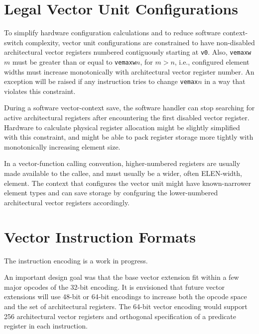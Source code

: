 \section{Legal Vector Unit Configurations}

To simplify hardware configuration calculations and to reduce software
context-switch complexity, vector unit configurations are constrained
to have non-disabled architectural vector registers numbered
contiguously starting at {\tt v0}.  Also, {\tt vemaxw}$m$ must be
greater than or equal to {\tt vemaxw}$n$, for $m > n$, i.e.,
configured element widths must increase monotonically with
architectural vector register number.  An exception will be raised if
any instruction tries to change {\tt vemax}$n$ in a way that violates
this constraint.

\begin{commentary}
  During a software vector-context save, the software handler can stop
  searching for active architectural registers after encountering the
  first disabled vector register.  Hardware to calculate physical
  register allocation might be slightly simplified with this
  constraint, and might be able to pack register storage more tightly
  with monotonically increasing element size.

  In a vector-function calling convention, higher-numbered registers
  are usually made available to the callee, and must usually be a
  wider, often ELEN-width, element.  The context that configures the
  vector unit might have known-narrower element types and can save
  storage by confguring the lower-numbered architectural vector
  registers accordingly.
\end{commentary}


\section{Vector Instruction Formats}

\begin{commentary}
  The instruction encoding is a work in progress.

  An important design goal was that the base vector extension fit
  within a few major opcodes of the 32-bit encoding.  It is envisioned
  that future vector extensions will use 48-bit or 64-bit encodings to
  increase both the opcode space and the set of architectural
  registers.  The 64-bit vector encoding would support 256
  architectural vector registers and orthogonal specification of a
  predicate register in each instruction.
\end{commentary}

